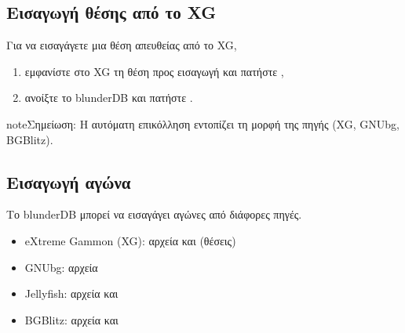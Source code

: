 \documentclass[letterpaper,10pt,greek]{sphinxmanual}
\begin{document}
\subsection{Εισαγωγή θέσης από το XG}
\label{\detokenize{guide_utilisateur:import-une-position-depuis-xg}}
\sphinxAtStartPar
Για να εισαγάγετε μια θέση απευθείας από το XG,
\begin{enumerate}
%
\item {} 
\sphinxAtStartPar
εμφανίστε στο XG τη θέση προς εισαγωγή και πατήστε ,

\item {} 
\sphinxAtStartPar
ανοίξτε το blunderDB και πατήστε .

\end{enumerate}

\begin{sphinxadmonition}{note}{Σημείωση:}
\sphinxAtStartPar
Η αυτόματη επικόλληση εντοπίζει τη μορφή της πηγής (XG, GNUbg, BGBlitz).
\end{sphinxadmonition}


\subsection{Εισαγωγή αγώνα}
\label{\detokenize{guide_utilisateur:importer-un-match}}
\sphinxAtStartPar
Το blunderDB μπορεί να εισαγάγει αγώνες από διάφορες πηγές.

\sphinxAtStartPar
{}
\begin{itemize}
\item {} 
\sphinxAtStartPar
eXtreme Gammon (XG): αρχεία  και  (θέσεις)

\item {} 
\sphinxAtStartPar
GNUbg: αρχεία 

\item {} 
\sphinxAtStartPar
Jellyfish: αρχεία  και 

\item {} 
\sphinxAtStartPar
BGBlitz: αρχεία  και 

\end{itemize}
\end{document}
